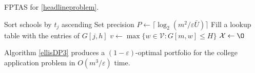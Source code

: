 \begin{algorithm}[h] 
\caption{FPTAS for \eqref{headlineproblem}.} \label{ellisDP3}
Sort schools by $t_j$ ascending\;
Set precision $P \gets \bigl\lceil\log_{2}\left(m^2 / \varepsilon \bar U\right)\bigr\rceil$\;
Fill a lookup table with the entries of $G[j, h]$\; \label{createdlookuptable}
$v\gets  \max\{ w \in \mathcal{V} : G[m, w] \leq H\}$\; \label{vrecordedhere}
$\mathcal{X} \gets \O$\;
\;
\end{algorithm}

\begin{theorem} \label{validityoffptas}
Algorithm \ref{ellisDP3} produces a $(1 - \varepsilon)$-optimal portfolio for the college application problem in $O(m^3 /\varepsilon)$ time.
\end{theorem}


